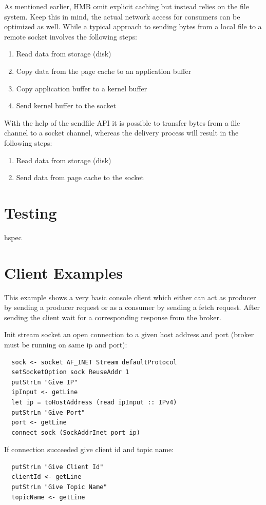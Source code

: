 As mentioned earlier, HMB omit explicit caching but instead relies on the file system.
Keep this in mind, the actual network access for consumers can be optimized as well.
While a typical approach to sending bytes from a local file to a remote
socket involves the following steps: 
\begin{enumerate}
  \item Read data from storage (disk)
  \item Copy data from the page cache to an application buffer
  \item Copy application buffer to a kernel buffer
  \item Send kernel buffer to the socket
\end{enumerate}

With the help of the sendfile API  it is possible to transfer bytes
from a file channel to a socket channel, whereas the delivery process will
result in the following steps:

\begin{enumerate}
  \item Read data from storage (disk)
  \item Send data from page cache to the socket
\end{enumerate}

\section{Testing}
hspec 

\section{Client Examples}
This example shows a very basic console client which either can act as producer
by sending a producer request or as a consumer by sending a fetch request. After
sending the client wait for a corresponding response from the broker.

Init stream socket an open connection to a given host address and port (broker must be running on same ip and port): 
\begin{lstlisting}
  sock <- socket AF_INET Stream defaultProtocol 
  setSocketOption sock ReuseAddr 1
  putStrLn "Give IP"
  ipInput <- getLine
  let ip = toHostAddress (read ipInput :: IPv4)
  putStrLn "Give Port"
  port <- getLine
  connect sock (SockAddrInet port ip)
\end{lstlisting}

If connection succeeded give client id and topic name: 
\begin{lstlisting}
  putStrLn "Give Client Id"
  clientId <- getLine
  putStrLn "Give Topic Name"
  topicName <- getLine
\end{lstlisting}

